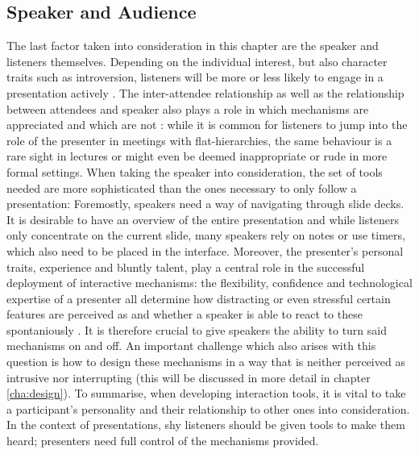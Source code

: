 
\subsection{Speaker and Audience}
The last factor taken into consideration in this chapter are the speaker and listeners themselves. Depending on the individual interest, but also character traits such as introversion, listeners will be more or less likely to engage in a presentation actively \cite{Bry:Backstage}. The inter-attendee relationship as well as the relationship between attendees and speaker also plays a role in which mechanisms are appreciated and which are not \cite{Moore:ThreeTypesOfInteraction}: while it is common for listeners to jump into the role of the presenter in meetings with flat-hierarchies, the same behaviour is a rare sight in lectures or might even be deemed inappropriate or rude in more formal settings. When taking the speaker into consideration, the set of tools needed are more sophisticated than the ones necessary to only follow a presentation: Foremostly, speakers need a way of navigating through slide decks. It is desirable to have an overview of the entire presentation and while listeners only concentrate on the current slide, many speakers rely on notes or use timers, which also need to be placed in the interface.
Moreover, the presenter's personal traits, experience and bluntly talent, play a central role in the successful deployment of interactive mechanisms: the flexibility, confidence and technological expertise of a presenter all determine how distracting or even stressful certain features are perceived as and whether a speaker is able to react to these spontaniously \cite{Wacker:PresenterExperience}. It is therefore crucial to give speakers the ability to turn said mechanisms on and off. An important challenge which also arises with this question is how to design these mechanisms in a way that is neither perceived as intrusive nor interrupting (this will be discussed in more detail in chapter \ref{cha:design}).
To summarise, when developing interaction tools, it is vital to take a participant's personality and their relationship to other ones into consideration. In the context of presentations, shy listeners should be given tools to make them heard; presenters need full control of the mechanisms provided.

